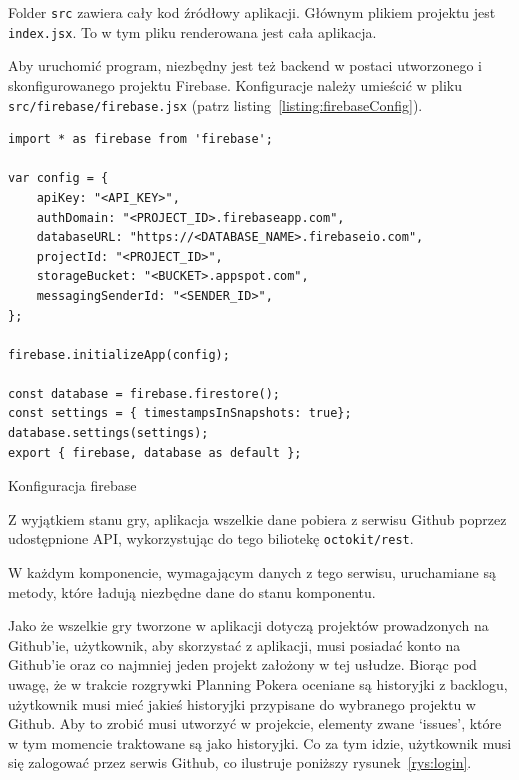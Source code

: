 Folder \texttt{src} zawiera cały kod źródłowy aplikacji.
Głównym plikiem projektu jest \texttt{index.jsx}. To w tym pliku renderowana jest cała aplikacja.

Aby uruchomić program,
niezbędny jest też backend w postaci utworzonego i skonfigurowanego projektu Firebase.
Konfiguracje należy umieścić w pliku \texttt{src/firebase/firebase.jsx}
(patrz listing~\ref{listing:firebaseConfig}).

\begin{listing}
\begin{verbatim}
import * as firebase from 'firebase';

var config = {
    apiKey: "<API_KEY>",
    authDomain: "<PROJECT_ID>.firebaseapp.com",
    databaseURL: "https://<DATABASE_NAME>.firebaseio.com",
    projectId: "<PROJECT_ID>",
    storageBucket: "<BUCKET>.appspot.com",
    messagingSenderId: "<SENDER_ID>",
};

firebase.initializeApp(config);

const database = firebase.firestore();
const settings = { timestampsInSnapshots: true};
database.settings(settings);
export { firebase, database as default };
\end{verbatim}
\caption{Konfiguracja firebase}\label{listing:firebaseConfig}
\end{listing}

Z wyjątkiem stanu gry, aplikacja wszelkie dane pobiera z serwisu Github poprzez
udostępnione API, wykorzystując do tego biliotekę \texttt{octokit/rest}.

W każdym komponencie, wymagającym danych z tego serwisu,
uruchamiane są metody, które ładują niezbędne dane do stanu komponentu.

Jako że wszelkie gry tworzone w aplikacji dotyczą projektów prowadzonych na Github'ie,
użytkownik, aby skorzystać z aplikacji, musi posiadać konto na Github'ie oraz co najmniej
jeden projekt założony w tej usłudze.
Biorąc pod uwagę, że w trakcie rozgrywki Planning Pokera oceniane są historyjki z backlogu,
użytkownik musi mieć jakieś historyjki przypisane do wybranego projektu w Github.
Aby to zrobić musi utworzyć w projekcie, elementy zwane `issues', które w tym momencie traktowane są jako historyjki.
Co za tym idzie, użytkownik musi się zalogować przez serwis Github, co ilustruje poniższy rysunek~\ref{rys:login}.

